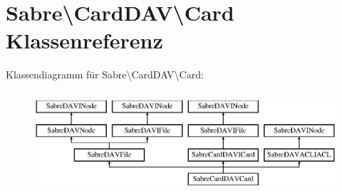 \hypertarget{class_sabre_1_1_card_d_a_v_1_1_card}{}\section{Sabre\textbackslash{}Card\+D\+AV\textbackslash{}Card Klassenreferenz}
\label{class_sabre_1_1_card_d_a_v_1_1_card}
Klassendiagramm für Sabre\textbackslash{}Card\+D\+AV\textbackslash{}Card\+:\begin{figure}[H]
\begin{center}
\leavevmode
\includegraphics[height=3.783784cm]{class_sabre_1_1_card_d_a_v_1_1_card}
\end{center}
\end{figure}
